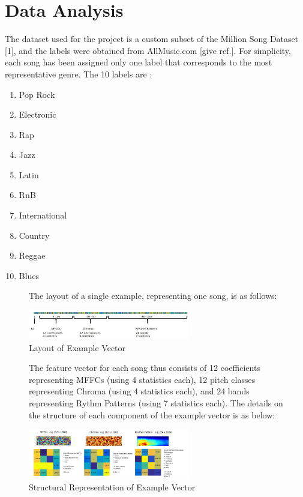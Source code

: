 \documentclass[journal]{IEEEtran}
\begin{document}
\section{Data Analysis}
The dataset used for the project is a custom subset of the Million Song Dataset [1], and the labels were obtained from AllMusic.com [give ref.]. For simplicity, each song has been assigned only one label that corresponds to the most representative genre. The 10 labels are :
\begin{enumerate}
	\item Pop Rock
	\item Electronic
	\item Rap
	\item Jazz
	\item Latin
	\item RnB
	\item International
	\item Country
	\item Reggae
	\item Blues
\end{enumerate}
\begin{figure}[h!]
The layout of a single example, representing one song, is as follows: \par
\begin{center}
	\includegraphics[width=200pt]{1_ExampleVectorStructure.PNG}
	\caption{Layout of Example Vector}
	\label{fig: Fig.1}
\end{center}
\end{figure}

\begin{figure}[h!]
The feature vector for each song thus consists of 12 coefficients representing MFFCs (using 4 statistics each), 12 pitch classes representing Chroma (using 4 statistics each), and 24 bands representing Rythm Patterns (using 7 statistics each). The details on the structure of each component of the example vector is as below: \par
\begin{center}
	\includegraphics[width=200pt]{1_ExampleVectorStructure_2.PNG}
	\caption{Structural Representation of Example Vector}
	\label{fig:Fig.2}
\end{center}
\end{figure}
\end{document}
